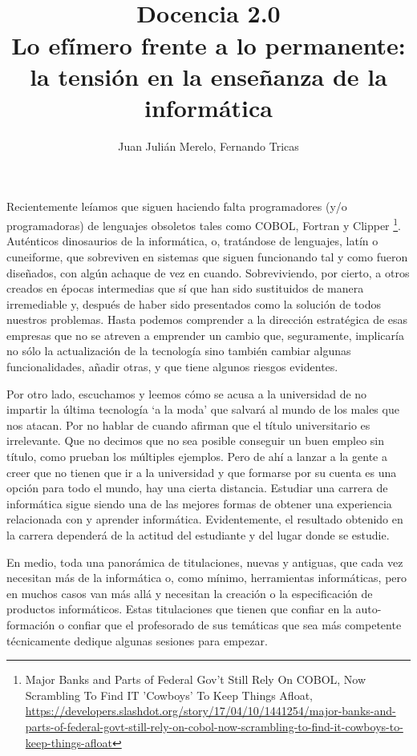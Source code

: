 \documentclass[twoside,10pt]{article}
\title{\ \\ Docencia 2.0\\ \LARGE Lo efímero frente a lo permanente: la tensión en la enseñanza de la informática}
\author{\large Juan Julián Merelo, Fernando Tricas}
\date{}
\begin{document}
\addtocounter{page}{2}

\maketitle
\vspace*{-5ex}

\begin{multicols}{2}

	Recientemente leíamos que siguen haciendo falta programadores
        (y/o programadoras) de lenguajes obsoletos tales como COBOL,
        Fortran y Clipper \footnote{Major Banks and Parts of Federal
          Gov't Still Rely On COBOL, Now Scrambling To Find IT
          'Cowboys' To Keep Things Afloat,
          \url{https://developers.slashdot.org/story/17/04/10/1441254/major-banks-and-parts-of-federal-govt-still-rely-on-cobol-now-scrambling-to-find-it-cowboys-to-keep-things-afloat}}. Auténticos
        dinosaurios de la informática, o, tratándose de lenguajes,
        latín o cuneiforme, que sobreviven en sistemas que siguen funcionando tal y como fueron diseñados, con algún achaque de vez en cuando. 
Sobreviviendo, por cierto, a otros creados en épocas intermedias que
sí que han sido sustituidos de manera irremediable y, después de haber
sido presentados como la solución de todos nuestros problemas.
Hasta podemos comprender a la dirección estratégica de esas empresas
que no se atreven a emprender un cambio que, seguramente, implicaría
no sólo la actualización de la tecnología sino también cambiar algunas
funcionalidades, añadir otras, y que tiene algunos riesgos evidentes. 

Por otro lado, escuchamos y leemos cómo se acusa a la universidad de no impartir la última tecnología `a la moda' que salvará al mundo de los males que nos atacan.
Por no hablar de cuando afirman que el título universitario es
irrelevante. Que no decimos que no sea posible conseguir un buen
empleo sin título, como prueban los múltiples ejemplos. Pero de ahí a
lanzar a la gente a creer que no tienen que ir a la universidad y que
formarse por su cuenta es una opción para todo el mundo, hay una
cierta distancia. Estudiar una carrera de informática sigue siendo una
de las mejores formas de obtener una experiencia relacionada con y
aprender informática. Evidentemente, el resultado obtenido en la
carrera dependerá de la actitud del estudiante y del lugar donde se
estudie. 

	En medio, toda una panorámica de titulaciones, nuevas y
        antiguas, que cada vez necesitan más de la informática o, como
        mínimo, herramientas informáticas, pero en muchos casos van
        más allá y necesitan la creación o la especificación de
        productos informáticos. Estas titulaciones que tienen
        que confiar en la auto-formación o confiar que el profesorado
        de sus temáticas que sea más competente técnicamente dedique
        algunas sesiones para empezar.


\end{multicols}
\end{document}
